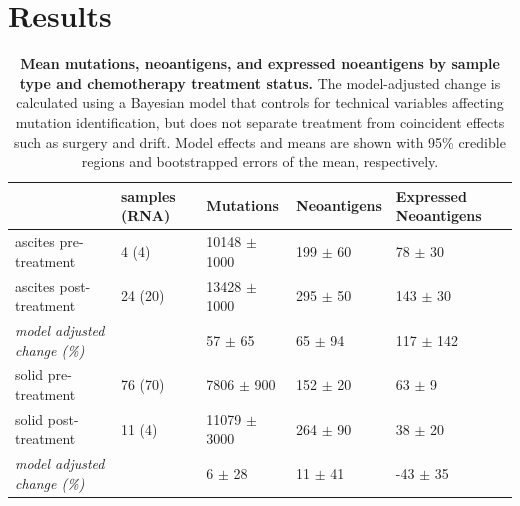 \section*{Results}

\begin{table}[htbp]

\begin{tabular}{lllll}
\toprule
{} & samples (RNA) &         Mutations &   Neoantigens & Expressed Neoantigens \\
\midrule
ascites pre-treatment                 &         4 (4) &  10148 $\pm$ 1000 &  199 $\pm$ 60 &           78 $\pm$ 30 \\
ascites post-treatment                &       24 (20) &  13428 $\pm$ 1000 &  295 $\pm$ 50 &          143 $\pm$ 30 \\
\textit{model adjusted change (\%)} &               &       57 $\pm$ 65 &   65 $\pm$ 94 &         117 $\pm$ 142 \\
\hline
solid pre-treatment                   &       76 (70) &    7806 $\pm$ 900 &  152 $\pm$ 20 &            63 $\pm$ 9 \\
solid post-treatment                  &        11 (4) &  11079 $\pm$ 3000 &  264 $\pm$ 90 &           38 $\pm$ 20 \\
\textit{model adjusted change (\%)}   &               &        6 $\pm$ 28 &   11 $\pm$ 41 &          -43 $\pm$ 35 \\
\bottomrule
\end{tabular}

\caption{\textbf{Mean mutations, neoantigens, and expressed noeantigens by sample type and chemotherapy treatment status.} The model-adjusted change is calculated using a Bayesian model that controls for technical variables affecting mutation identification, but does not separate treatment from coincident effects such as surgery and drift. Model effects and means are shown with 95\% credible regions and bootstrapped errors of the mean, respectively.}
\label{tab:cohort}
\end{table}


